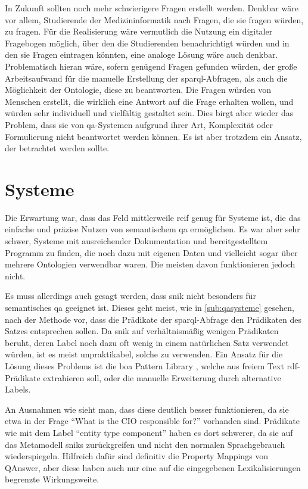 In Zukunft sollten noch mehr schwierigere Fragen erstellt werden.
Denkbar wäre vor allem, Studierende der Medizininformatik nach Fragen, die sie fragen würden, zu fragen.
Für die Realisierung wäre vermutlich die Nutzung ein digitaler Fragebogen möglich, über den die Studierenden benachrichtigt würden und in den sie Fragen eintragen könnten,
eine analoge Lösung wäre auch denkbar.
Problematisch hieran wäre, sofern genügend Fragen gefunden würden, der große Arbeitsaufwand für die manuelle Erstellung der \ac{sparql}-Abfragen, als auch die Möglichkeit der Ontologie, diese zu beantworten.
Die Fragen würden von Menschen erstellt, die wirklich eine Antwort auf die Frage erhalten wollen, und würden sehr individuell und vielfältig gestaltet sein.
Dies birgt aber wieder das Problem, dass sie von \ac{qa}-Systemen aufgrund ihrer Art, Komplexität oder Formulierung nicht beantwortet werden können.
Es ist aber trotzdem ein Ansatz, der betrachtet werden sollte.

\section{Systeme}

Die Erwartung war, dass das Feld mittlerweile reif genug für Systeme ist, die das einfache und präzise Nutzen von semantischem \acl{qa} ermöglichen.
Es war aber sehr schwer, Systeme mit ausreichender Dokumentation und bereitgestelltem Programm zu finden, die noch dazu mit eigenen Daten und vielleicht sogar über mehrere Ontologien verwendbar waren.
Die meisten davon funktionieren jedoch nicht.

Es muss allerdings auch gesagt werden, dass \ac{snik} nicht besonders für semantisches \acl{qa} geeignet ist.
Dieses geht meist, wie in \cref{sub:qasysteme} gesehen, nach der Methode vor, dass die Prädikate der \ac{sparql}-Abfrage den Prädikaten des Satzes entsprechen sollen.
Da \ac{snik} auf verhältnismäßig wenigen Prädikaten beruht, deren Label noch dazu oft wenig in einem natürlichen Satz verwendet würden, ist es meist unpraktikabel, solche zu verwenden.
Ein Ansatz für die Lösung dieses Problems ist die \ac{boa} Pattern Library \citep{boapatternlibrary}, welche aus freiem Text \ac{rdf}-Prädikate extrahieren soll, oder die manuelle Erweiterung durch alternative Labels.

An Ausnahmen wie  sieht man, dass diese deutlich besser funktionieren, da sie etwa in der Frage \enquote{What is the CIO responsible for?} vorhanden sind.
Prädikate wie  mit dem Label \enquote{entity type component} haben es dort schwerer, da sie auf das Metamodell \ac{snik}s zurückgreifen
und nicht den normalen Sprachgebrauch wiederspiegeln.
Hilfreich dafür sind definitiv die Property Mappings von QAnswer, aber diese haben auch nur eine auf die eingegebenen Lexikalisierungen begrenzte Wirkungsweite.

